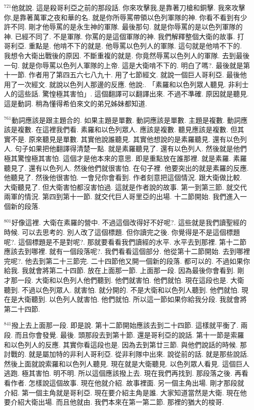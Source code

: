 \documentclass{book}
\begin{document}
$^{721}$他就說.
這是殺哥利亞之前的那段話.
你來攻擊我,是靠著刀槍和銅擊.
我來攻擊你,是靠著萬軍之夜和華的名.
就是你所辱罵帶領以色列軍隊的神.
你看不看到有少許不同.
剛才他辱罵的是永生神的軍隊.
最後那句.
就是你辱罵的是以色列軍隊的神.
已經不同了.
不是軍隊.
你罵的是這個軍隊的神.
我們解釋整個大衛的故事.
打哥利亞.
重點是.
他啃不下的就是.
他辱罵以色列人的軍隊.
這句就是他啃不下的.
我想令大衛出戰後的原因.
不斷重複的就是.
你竟然辱罵以色列人的軍隊.
去到最後一句.
就是你辱罵以色列人軍隊的上帝.
這是大衛啃不下的.
明白了嗎?.
最後就是第十一節.
作者用了第四五六七八九十.
用了七節經文.
就說一個巨人哥利亞.
最後他用了一次經文.
就說以色列人那邊的反應.
他說:.
「素羅和以色列眾人聽見.
非利士人的這些話.
驚惶極其害怕」.
這個翻譯可以翻譯出來.
不過不準確.
原因就是聽見.
這是動詞.
稍為懂得希伯來文的弟兄姊妹都知道.

$^{761}$動詞應該是跟主題合的.
如果主題是單數.
動詞應該是單數.
主題是複數.
動詞應該是複數.
在這裡我們看.
素羅和以色列眾人.
應該是複數.
聽見應該是複數.
但其實不是.
原來聽見是單數.
其實他說誰聽見.
其實他想說的是素羅聽見.
還有以色列人.
句子如果把他翻譯得清楚一點.
就是素羅聽見了.
還有以色列人.
然後就是他們極其驚惶極其害怕.
這個才是他本來的意思.
即是重點放在誰那裡.
就是素羅.
素羅聽見了.
還有以色列人.
然後他們就很害怕.
在句子裡.
他要突出的就是素羅的反應.
他聽見了.
然後他很害怕.
一會兒你會看到.
作者刻意把這個情況.
跟大衛做比較.
大衛聽見了.
但大衛害怕都沒害怕過.
這就是作者說的故事.
第一到第三節.
就交代兩軍的情況.
第四到第十一節.
就交代巨人哥里亞的出場.
十二節開始.
我們進入一個新的段落.

$^{801}$好像這裡.
大衛在素羅的營中.
不過這個改得好不好呢?.
這些就是我們讀聖經的時候.
可以去思考的.
別人改了這個標題.
但你讀完之後.
你覺得是不是這個標題呢?.
這個標題是不是對呢?.
那就要看看我們讀經的水平.
水平去到那裡.
第十二節應該去到哪裡.
就有一個段落呢?.
我們看看這個部分.
他從第十二節開始.
去到哪裡完呢?.
他去到第二十三節完.
二十四節他又開一個新的段落.
都可以的.
不過如果你給我.
我就會將第二十四節.
放在上面那一節.
上面那一段.
因為最後你會看到.
剛才那一段.
大衛和以色列人他們聽到.
他們就害怕.
他們就怕.
現在這段也是.
大衛聽到.
不過以色列眾人.
就害怕.
就分開的.
不是大衛和以色列人聽到.
他們就怕.
現在是大衛聽到.
以色列人就害怕.
他們就怕.
所以這一節如果你給我分段.
我就會將第二十四節.

$^{841}$撥上去上面那一段.
即是說.
第十二節開始應該去到二十四節.
這樣就平衡了.
兩段.
而且你會發覺.
最後.
頭那段去到第十節.
還是哥利亞的說話.
第十一節是索羅和以色列人的反應.
其實你看這段也是.
因為去到第廿三節.
與他們說話的時候.
那討戰的.
就是屬加特的非利人哥利亞.
從非利隊中出來.
說從前的話.
就是那些說話.
然後上面就說索羅和以色列人聽見.
現在就是大衛聽見.
以色列眾人看見.
這個巨人逃跑.
極其害怕.
明不明.
所以這個應該撥上去.
現在我們再找到.
那段落之後.
再看看作者.
怎樣說這個故事.
現在他就介紹.
故事裡面.
另一個主角出場.
剛才那段就介紹.
第一個主角就是哥利亞.
現在要介紹主角是誰.
大家知道當然是大衛.
現在他要介紹大衛出場.
而且他就由.
我們本來在第一第二節.
那裡的猶大的梭哥.
\end{document}
